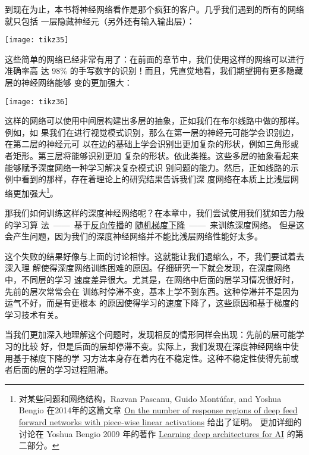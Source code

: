 到现在为止，本书将神经网络看作是那个疯狂的客户。几乎我们遇到的所有的网络就只包括
一层隐藏神经元（另外还有输入输出层）：
\begin{center}
  \texttt{[image: tikz35]}
\end{center}

这些简单的网络已经非常有用了：在前面的章节中，我们使用这样的网络可以进行准确率高
达 98\% 的手写数字的识别！而且，凭直觉地看，我们期望拥有更多隐藏层的神经网络能够
变的更加强大：
\begin{center}
  \texttt{[image: tikz36]}
\end{center}

这样的网络可以使用中间层构建出多层的抽象，正如我们在布尔线路中做的那样。例如，如
果我们在进行视觉模式识别，那么在第一层的神经元可能学会识别边，在第二层的神经元可
以在边的基础上学会识别出更加复杂的形状，例如三角形或者矩形。第三层将能够识别更加
复杂的形状。依此类推。这些多层的抽象看起来能够赋予深度网络一种学习解决复杂模式识
别问题的能力。然后，正如线路的示例中看到的那样，存在着理论上的研究结果告诉我们深
度网络在本质上比浅层网络更加强大\footnote{对某些问题和网络结构，Razvan Pascanu,
  Guido Montúfar, and Yoshua Bengio 在2014年的这篇文章
  \href{http://arxiv.org/pdf/1312.6098.pdf}{On the number of response regions of
    deep feed forward networks with piece-wise linear activations} 给出了证明。
  更加详细的讨论在 Yoshua Bengio 2009 年的著作
  \href{http://www.iro.umontreal.ca/~bengioy/papers/ftml_book.pdf}{Learning deep
    architectures for AI} 的第二部分。}。
 
那我们如何训练这样的深度神经网络呢？在本章中，我们尝试使用我们犹如苦力般的学习算
法~——~基于\hyperref[ch:HowTheBackpropagationAlgorithmWorks]{反向传播}的%
\hyperref[sec:learning_with_gradient_descent]{随机梯度下降}~——~来训练深度网络。
但是这会产生问题，因为我们的深度神经网络并不能比浅层网络性能好太多。
 
这个失败的结果好像与上面的讨论相悖。这就能让我们退缩么，不，我们要试着去深入理
解使得深度网络训练困难的原因。仔细研究一下就会发现，在深度网络中，不同层的学习
速度差异很大。尤其是，在网络中后面的层学习情况很好时，先前的层次常常会在
训练时停滞不变，基本上学不到东西。这种停滞并不是因为运气不好，而是有更根本
的原因使得学习的速度下降了，这些原因和基于梯度的学习技术有关。
 
当我们更加深入地理解这个问题时，发现相反的情形同样会出现：先前的层可能学习的比较
好，但是后面的层却停滞不变。实际上，我们发现在深度神经网络中使用基于梯度下降的学
习方法本身存在着内在不稳定性。这种不稳定性使得先前或者后面的层的学习过程阻滞。
 
